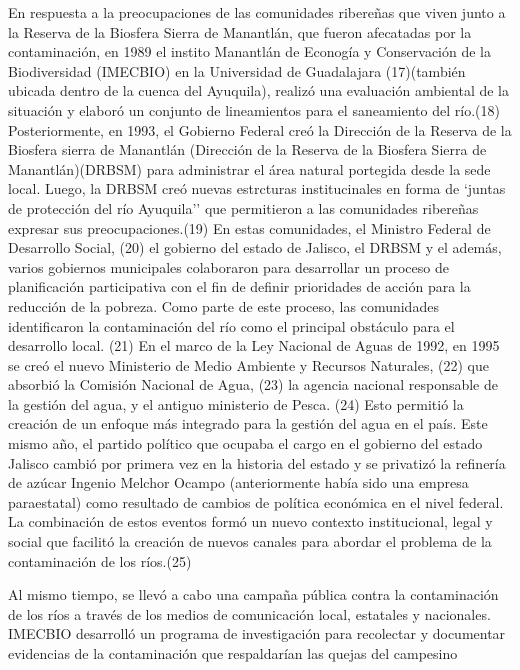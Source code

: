     En respuesta a la preocupaciones de las comunidades ribereñas que viven junto a la Reserva de la Biosfera Sierra de Manantlán, que fueron afecatadas por la contaminación, en 1989 el instito Manantlán de Econogía y Conservación de la Biodiversidad (IMECBIO) en la Universidad de Guadalajara (17)(también ubicada dentro de la cuenca del Ayuquila), realizó una evaluación ambiental de la situación y elaboró un conjunto de lineamientos para el saneamiento del río.(18) Posteriormente, en 1993, el Gobierno Federal creó la Dirección de la Reserva de la Biosfera sierra de Manantlán (Dirección de la Reserva de la Biosfera Sierra de Manantlán)(DRBSM) para administrar el área natural portegida desde la sede local. Luego, la DRBSM creó nuevas estrcturas institucinales en forma de `juntas de protección del río Ayuquila'' que permitieron a las comunidades ribereñas expresar sus preocupaciones.(19) En estas comunidades, el Ministro Federal de Desarrollo Social, (20) el gobierno del estado de Jalisco, el DRBSM y el además, varios gobiernos municipales colaboraron para desarrollar un proceso de planificación participativa con el fin de definir prioridades de acción para la reducción de la pobreza. Como parte de este proceso, las comunidades identificaron la contaminación del río como el principal obstáculo para el desarrollo local. (21) En el marco de la Ley Nacional de Aguas de 1992, en 1995 se creó el nuevo Ministerio de Medio Ambiente y Recursos Naturales, (22) que absorbió la Comisión Nacional de Agua, (23) la agencia nacional responsable de la gestión del agua, y el antiguo ministerio de Pesca. (24) Esto permitió la creación de un enfoque más integrado para la gestión del agua en el país. Este mismo año, el partido político que ocupaba el cargo en el gobierno del estado Jalisco cambió por primera vez en la historia del estado y se privatizó la refinería de azúcar Ingenio Melchor Ocampo (anteriormente había sido una empresa paraestatal) como resultado de cambios de política económica en el nivel federal. La combinación de estos eventos formó un nuevo contexto institucional, legal y social que facilitó la creación de nuevos canales para abordar el problema de la contaminación de los ríos.(25)

    Al mismo tiempo, se llevó a cabo una campaña pública contra la contaminación de los ríos a través de los medios de comunicación local, estatales y nacionales. IMECBIO desarrolló un programa de investigación para recolectar y documentar evidencias de la contaminación que respaldarían las quejas del campesino
